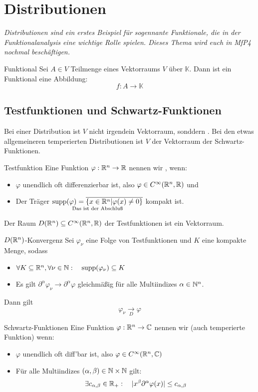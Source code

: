 \newpage
\section[Distributionen]{Distributionen}
\textit{Distributionen sind ein erstes Beispiel für sogennante Funktionale, die in der Funktionalanalysis eine wichtige Rolle spielen. Dieses Thema wird euch in MfP4 nochmal beschäftigen.}
\begin{Def}{Funktional}
Sei $A\in V$ Teilmenge eines Vektorraums $V$ über $\mathbb{K}$. Dann ist ein Funktional eine Abbildung:
$$f:A\rightarrow \mathbb{K}$$
\end{Def}
\subsection{Testfunktionen und Schwartz-Funktionen}
Bei einer Distribution ist $V$ nicht irgendein Vektorraum, sonddern . Bei den etwas allgemeineren temperierten Distributionen ist $V$ der Vektorraum der Schwartz-Funktionen.
\begin{Def}{Testfunktion}
    Eine Funktion $\varphi: \mathbb{R}^n \rightarrow \mathbb{R}$ nennen wir , wenn:
    \begin{itemize}
        \item $\varphi$ unendlich oft differenzierbar ist, also $\varphi \in C^\infty(\mathbb{R}^n, \mathbb{R})$ und
        \item Der Träger $\underset{\text{Das ist der Abschluß}}{\text{supp}(\varphi)=\overline{\{x\in\mathbb{R}^n| \varphi(x)\neq 0\}}}$ kompakt ist.
    \end{itemize}
\end{Def}
Der Raum $D(\mathbb{R}^n)\subseteq C^\infty(\mathbb{R}^n, \mathbb{R})$ der Testfunktionen ist ein Vektorraum.
\begin{Def}{$D(\mathbb{R}^n)$-Konvergenz}
    Sei $\varphi_\nu$ eine Folge von Testfunktionen und $K$ eine kompakte Menge, sodass
    \begin{itemize}
        \item $\forall K\subseteq \mathbb{R}^n, \forall \nu \in \mathbb{N}: \quad \text{supp}(\varphi_\nu)\subseteq K$
        \item Es gilt $\partial^\alpha \varphi_\nu\rightarrow \partial^\alpha \varphi$ gleichmäßig für alle Multiindizes $\alpha\in \mathbb{N}^n$.
    \end{itemize}
    Dann gilt $$\varphi_\nu \underset{D}{\rightarrow}\varphi$$
\end{Def}
\begin{Def}{Schwartz-Funktionen}
    Eine Funktion $\varphi: \mathbb{R}^n \rightarrow \mathbb{C}$ nennen wir  (auch temperierte Funktion) wenn:
    \begin{itemize}
        \item $\varphi$ unendlich oft diff'bar ist, also $\varphi\in C^\infty (\mathbb{R}^n, \mathbb{C})$
        \item Für alle Multiindizes $(\alpha, \beta)\in \mathbb{N}\times \mathbb{N}$ gilt:
        $$\exists c_{\alpha,\beta}\in \mathbb{R}_+: \quad |x^\beta \partial^\alpha \varphi(x)|\leq c_{\alpha,\beta}$$
    \end{itemize}
    
\end{Def}
